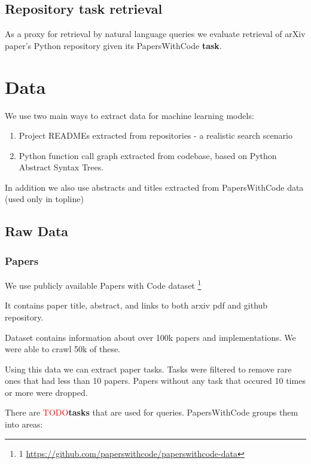 \documentclass[longabstract,mgr,english]{iithesis}
\newcommand{\TODO}{\textcolor{red}{\huge{TODO}}}
\begin{document}
\section{Repository task retrieval}

As a proxy for retrieval by natural language queries we  evaluate retrieval of arXiv paper's Python repository given its PapersWithCode \textbf{task}.

\chapter{Data}

We use two main ways to extract data for machine learning models:

\begin{enumerate}

\item Project READMEs extracted from repositories - a realistic search scenario

\item Python function call graph extracted from codebase, based on Python Abstract Syntax Trees. 

\end{enumerate}

In addition we also use abstracts and titles extracted from PapersWithCode data (used only in topline)

\section{Raw Data}

\subsection{Papers}

We use publicly available Papers with Code dataset \footnote{1 \url{https://github.com/paperswithcode/paperswithcode-data}}

It contains paper title, abstract, and links to both arxiv pdf and github repository.

Dataset contains information about over 100k papers and implementations. We were able to crawl 50k of these.

Using this data we can extract paper tasks. Tasks were filtered to remove rare ones that had less than 10 papers. Papers without any task that occured 10 times or more were dropped.

There are \TODO \textbf{tasks} that are used for queries. PapersWithCode groups them into areas:
\end{document}
